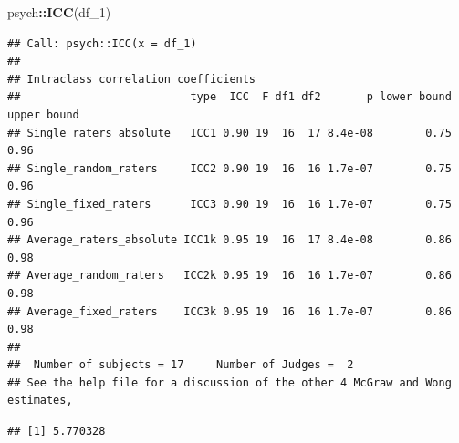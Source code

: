 \documentclass[
]{book}
\newenvironment{Shaded}{\begin{snugshade}}{\end{snugshade}}
\newcommand{\AttributeTok}[1]{\textcolor[rgb]{0.13,0.29,0.53}{#1}}
\newcommand{\CommentTok}[1]{\textcolor[rgb]{0.56,0.35,0.01}{\textit{#1}}}
\newcommand{\ConstantTok}[1]{\textcolor[rgb]{0.56,0.35,0.01}{#1}}
\newcommand{\DecValTok}[1]{\textcolor[rgb]{0.00,0.00,0.81}{#1}}
\newcommand{\FunctionTok}[1]{\textcolor[rgb]{0.13,0.29,0.53}{\textbf{#1}}}
\newcommand{\NormalTok}[1]{#1}
\newcommand{\SpecialCharTok}[1]{\textcolor[rgb]{0.81,0.36,0.00}{\textbf{#1}}}
\begin{document}
\begin{Shaded}
\begin{Highlighting}[]
\NormalTok{psych}\SpecialCharTok{::}\FunctionTok{ICC}\NormalTok{(df\_1)}
\end{Highlighting}
\end{Shaded}

\begin{verbatim}
## Call: psych::ICC(x = df_1)
## 
## Intraclass correlation coefficients 
##                          type  ICC  F df1 df2       p lower bound upper bound
## Single_raters_absolute   ICC1 0.90 19  16  17 8.4e-08        0.75        0.96
## Single_random_raters     ICC2 0.90 19  16  16 1.7e-07        0.75        0.96
## Single_fixed_raters      ICC3 0.90 19  16  16 1.7e-07        0.75        0.96
## Average_raters_absolute ICC1k 0.95 19  16  17 8.4e-08        0.86        0.98
## Average_random_raters   ICC2k 0.95 19  16  16 1.7e-07        0.86        0.98
## Average_fixed_raters    ICC3k 0.95 19  16  16 1.7e-07        0.86        0.98
## 
##  Number of subjects = 17     Number of Judges =  2
## See the help file for a discussion of the other 4 McGraw and Wong estimates,
\end{verbatim}

\begin{Shaded}
\end{Shaded}

\begin{verbatim}
## [1] 5.770328
\end{verbatim}
\end{document}
